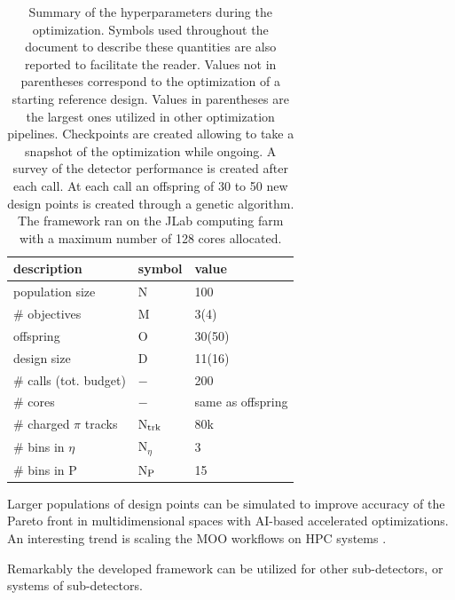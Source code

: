 \begin{table}[!]
    \centering
    \begin{tabular}{|M{3.cm} | M{3.5cm}| M{2.0cm}|}
        \hline
        \textbf{description} & \textbf{symbol} & \textbf{value} \\ 
        \hline
        \hline
        \small{population size} & N & 100 \\
        \small{\# objectives}   & M & 3(4)\\ 
        \small{offspring} & O & 30(50)\\
        \small{design size} & D & 11(16) \\
        \small{\# calls (tot. budget)} & $-$ & 200\\
        \small{\# cores} & $-$ & \small{same as offspring} \\
        \small{\# charged $\pi$ tracks} & N$_{\textup{trk}}$ & 80k\\
        \small{\# bins in $\eta$} & N$_{\eta}$ & 3 \\
        \small{\# bins in P} & N$_{\textup{P}}$ & 15 \\
        \hline
    \end{tabular}
    \caption{Summary of the hyperparameters during the optimization. Symbols used throughout the document to describe these quantities are also reported to facilitate the reader. Values not in parentheses correspond to the optimization of a starting reference design. Values in parentheses are the largest ones utilized in other optimization pipelines. Checkpoints are created allowing to take a snapshot of the optimization while ongoing. A survey of the detector performance is created after each call. At each call an offspring of 30 to 50 new design points is created through a genetic algorithm. The framework ran on the JLab computing farm with a maximum number of 128 cores allocated.
    }
    \label{tab:complexity}
\end{table}



Larger populations of design points can be simulated to improve accuracy of the Pareto front in multidimensional spaces with AI-based accelerated optimizations. 
An interesting trend is scaling the MOO workflows on HPC systems \cite{liu2020parallelization}. 

Remarkably the developed framework can be utilized for other sub-detectors, or systems of sub-detectors.

\clearpage